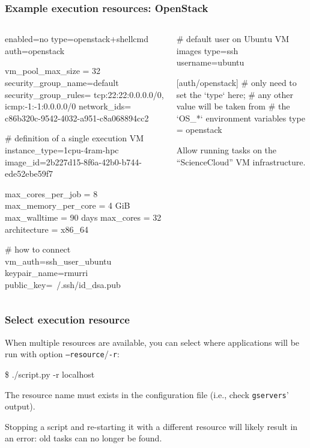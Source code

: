 \documentclass[english,serif,mathserif,xcolor=pdftex,dvipsnames,table]{beamer}
\begin{document}
\begin{frame}[fragile]
  \frametitle{Example execution resources: OpenStack}
  \begin{columns}[t]
    \begin{column}{0.5\textwidth}
\begin{stdout}
enabled=no
type=openstack+shellcmd
auth=openstack

vm_pool_max_size = 32
security_group_name=default
security_group_rules=
  tcp:22:22:0.0.0.0/0,
  icmp:-1:-1:0.0.0.0/0
network_ids=
  c86b320c-9542-4032-a951-c8a068894cc2

# definition of a single execution VM
instance_type=1cpu-4ram-hpc
image_id=2b227d15-8f6a-42b0-b744-ede52ebe59f7

max_cores_per_job = 8
max_memory_per_core = 4 GiB
max_walltime = 90 days
max_cores = 32
architecture = x86_64

# how to connect
vm_auth=ssh_user_ubuntu
keypair_name=rmurri
public_key=~/.ssh/id_dsa.pub
\end{stdout}
    \end{column}
    \begin{column}{0.5\textwidth}
      \begin{stdout}
# default user on Ubuntu VM images
type=ssh
username=ubuntu


[auth/openstack]
# only need to set the `type` here;
# any other value will be taken from
# the `OS\_*` environment variables
type = openstack
      \end{stdout}

      \+\+\+
      Allow running tasks on the ``ScienceCloud'' VM infrastructure.

    \end{column}
  \end{columns}
\end{frame}


\begin{frame}
  \frametitle{Select execution resource}

  When multiple resources are available, you can select where
  applications will be run with option \texttt{--resource}/\texttt{-r}:
\begin{semiverbatim}
    \$ ./script.py -r localhost
\end{semiverbatim}

  \+ The resource name must exists in the configuration file (i.e.,
  check \texttt{gservers}' output).

  \+ Stopping a script and re-starting it with a different resource
  will likely result in an error: old tasks can no longer be found.
\end{frame}
\end{document}
